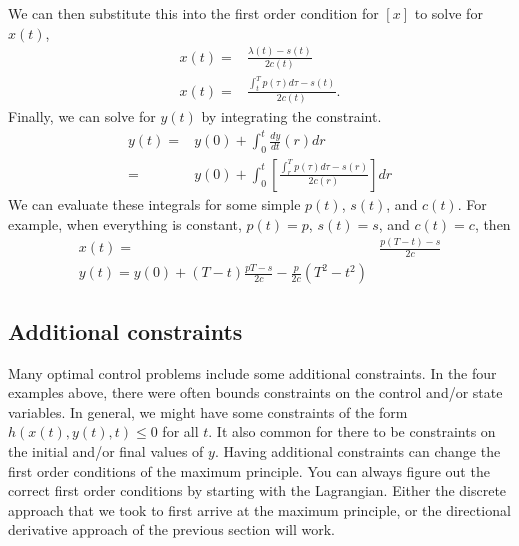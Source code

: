 \begin{example}
  We can then substitute this into the first order condition for $[x]$
  to solve for $x(t)$,
  \begin{align*}
    x(t) = & \frac{\lambda(t) - s(t)}{2c(t)} \\
    x(t) = & \frac{\int_{t}^T p(\tau)d\tau - s(t)}{2c(t)}.
  \end{align*}
  Finally, we can solve for $y(t)$ by integrating the constraint.
  \begin{align*}
    y(t) = & y(0) + \int_0^t \frac{dy}{dt}(r) dr \\
    = & y(0) + \int_0^t \left[ \frac{\int_{r}^T p(\tau)d\tau - s(r)}{2c(r)} \right] dr 
  \end{align*}
  We can evaluate these integrals for some simple $p(t)$, $s(t)$, and $c(t)$.
  For example, when everything is constant, $p(t) = p$, $s(t)=s$, and
  $c(t)=c$, then 
  \begin{align*}
    x(t) = & \frac{p(T-t) - s}{2c} \\
    y(t) = y(0) + (T-t)\frac{pT-s}{2c} - \frac{p}{2c}(T^2-t^2)
  \end{align*}
\end{example}

\subsection{Additional constraints \label{sec:constraints}}

Many optimal control problems include some additional constraints. In
the four examples above, there were often bounds constraints on the
control and/or state variables. In general, we might have some
constraints of the form $h(x(t),y(t), t) \leq 0$ for all $t$. It also
common for there to be constraints on the initial and/or final values
of $y$. Having additional constraints can change the first order
conditions of the maximum principle. You can always figure out the
correct first order conditions by starting with the Lagrangian. Either
the discrete approach that we took to first arrive at the maximum
principle, or the directional derivative approach of the previous
section will work. 

